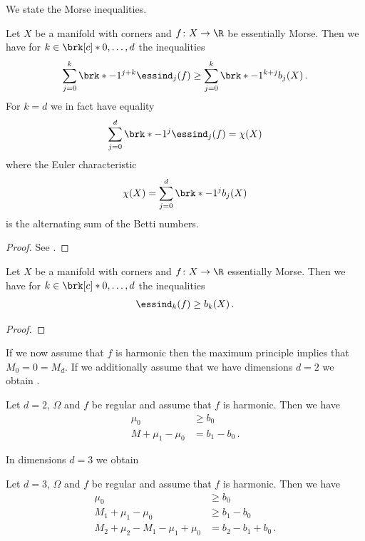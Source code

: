We state the Morse inequalities.
\begin{theorem}
Let $X$ be a manifold with corners and $f\colon X\to\R$ be essentially Morse.
Then we have for $k\in\brk[c]*{0,\dots,d}$ the inequalities
\begin{align*}
  \sum_{j=0}^k \brk*{-1}^{j+k}\essind_j(f)\geq \sum_{j=0}^k\brk*{-1}^{k+j}b_j(X)\,.
\end{align*}
For $k=d$ we in fact have equality
\begin{align*}
  \sum_{j=0}^d \brk*{-1}^{j}\essind_j(f)= \chi(X)
\end{align*}
where the Euler characteristic
\begin{align*}
  \chi(X)=\sum_{j=0}^d\brk*{-1}^{j}b_j(X)
\end{align*}
is the alternating sum of the Betti numbers.
\end{theorem}
\begin{proof}
  See \cite[Theorem 10.2']{Morse1969}.
\end{proof}

\begin{corollary}
  Let $X$ be a manifold with corners and $f\colon X\to\R$ essentially Morse. Then we have for $k\in\brk[c]*{0,\dots,d}$
  the inequalities
  \begin{align*}
    \essind_k(f)\geq b_k(X)\,.
  \end{align*}
\end{corollary}
\begin{proof}
\end{proof}
If we now assume that $f$ is harmonic then the maximum principle implies that
$M_0=0=M_d$.
If we additionally assume that we have dimensions $d=2$ we obtain \cite[Corollary 10.1]{Morse1969}.
\begin{corollary}[Morse inequalities for $f$ harmonic, $d=2$]
  Let $d=2$, $\Omega$ and $f$ be regular and assume that $f$ is harmonic. Then we have
  \begin{align*}
    \mu_0&\geq b_0 \\
    M+\mu_1-\mu_0&=b_1-b_0\,.
  \end{align*}
\end{corollary}
In dimensions $d=3$ we obtain \cite[Corollary 10.2]{Morse1969}
\begin{corollary}[Morse inequalities for $f$ harmonic, $d=3$]
  Let $d=3$, $\Omega$ and $f$ be regular and assume that $f$ is harmonic. Then we have
  \begin{align*}
    \mu_0&\geq b_0 \\
    M_1+\mu_1-\mu_0&\geq b_1-b_0 \\
    M_2+\mu_2-M_1-\mu_1+\mu_0&= b_2-b_1+b_0\,.
  \end{align*}
\end{corollary}

